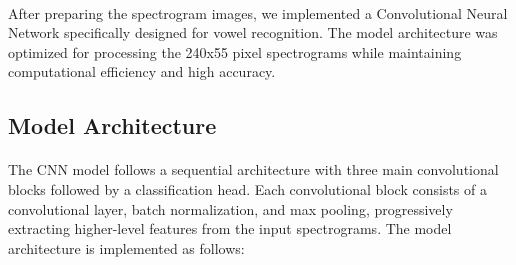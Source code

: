 \paragraph{}
After preparing the spectrogram images, we implemented a Convolutional Neural Network specifically designed for vowel recognition. The model architecture was optimized for processing the 240x55 pixel spectrograms while maintaining computational efficiency and high accuracy.

\subsection{Model Architecture}
\label{subsec:model-architecture}

\paragraph{}
The CNN model follows a sequential architecture with three main convolutional blocks followed by a classification head. Each convolutional block consists of a convolutional layer, batch normalization, and max pooling, progressively extracting higher-level features from the input spectrograms. The model architecture is implemented as follows:


